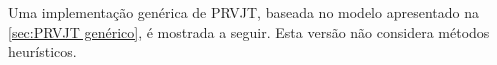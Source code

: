 Uma implementação genérica de PRVJT, baseada no modelo apresentado na \cref{sec:PRVJT genérico}, é mostrada a seguir. Esta versão não considera métodos heurísticos.

